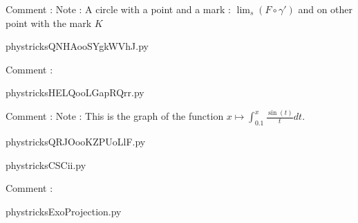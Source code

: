     Comment : Note : A circle with a point and a mark : $ \lim_{s} (F\circ\gamma')  $ and on other point with the mark $ K $

    \clearpage
    


    \newcommand{\CaptionFigQNHAooSYgkWVhJ}{<+Type your caption here+>}
    \begin{center}
        
    \end{center}
    phystricksQNHAooSYgkWVhJ.py

    Comment : 

    \clearpage
    


    \newcommand{\CaptionFigHELQooLGapRQrr}{<+Type your caption here+>}
    \begin{center}
        
    \end{center}
    phystricksHELQooLGapRQrr.py

    Comment : Note : This is the graph of the function $ x\mapsto  \int_{0.1}^x\frac{ \sin(t) }{ t } dt$.

    \clearpage
    


    \newcommand{\CaptionFigQRJOooKZPUoLlF}{<+Type your caption here+>}
    \begin{center}
        
    \end{center}
    phystricksQRJOooKZPUoLlF.py

    

    \clearpage
    


    \newcommand{\CaptionFigCSCii}{<+Type your caption here+>}
    \begin{center}
        
    \end{center}
    phystricksCSCii.py

    Comment : 

    \clearpage
    


    \newcommand{\CaptionFigExoProjection}{<+Type your caption here+>}
    \begin{center}
        
    \end{center}
    phystricksExoProjection.py

